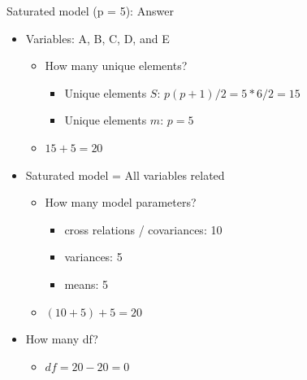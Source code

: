 \documentclass[10pt]{beamer}\usepackage[]{graphicx}\usepackage[]{xcolor}
\begin{document}
\begin{frame}[fragile]{Saturated model (p = 5): Answer}

\begin{itemize}
\item{Variables: A, B, C, D, and E}  
  \begin{itemize}
  \item{How many unique elements?}
  \begin{itemize}
    \item{Unique elements $S$: $p(p+1)/2 = 5*6/2 = 15$}
    \item{Unique elements $m$: $p = 5$}
  \end{itemize}
  \item{$15+5 = 20$}
\end{itemize}
\vspace{5mm}
\item{Saturated model = All variables related}
  \begin{itemize}
  \item{How many model parameters?}
  \begin{itemize}
    \item{cross relations / covariances: 10}
    \item{variances: 5}
    \item{means: 5}
  \end{itemize}
  \item $(10+5)+5 = 20$
\end{itemize}
\vspace{5mm}
\item{How many df?}
  \begin{itemize}
    \item{$df = 20 - 20 = 0$}
  \end{itemize}
\end{itemize}
\end{frame}
%
\end{document}
